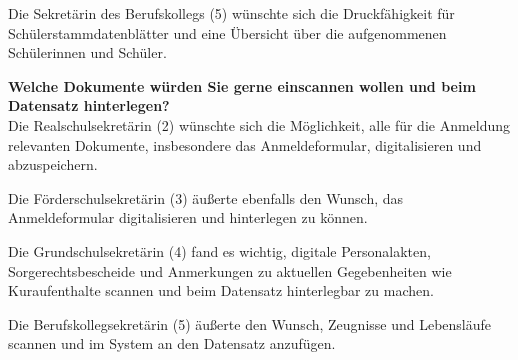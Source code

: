 Die Sekretärin des Berufskollegs (5) wünschte sich die Druckfähigkeit für Schülerstammdatenblätter und eine Übersicht über die aufgenommenen Schülerinnen und Schüler.

\textbf{Welche Dokumente würden Sie gerne einscannen wollen und beim Datensatz hinterlegen?}\\
Die Realschulsekretärin (2) wünschte sich die Möglichkeit, alle für die Anmeldung relevanten Dokumente, insbesondere das Anmeldeformular, digitalisieren und abzuspeichern.

Die Förderschulsekretärin (3) äußerte ebenfalls den Wunsch, das Anmeldeformular digitalisieren und hinterlegen zu können.

Die Grundschulsekretärin (4) fand es wichtig, digitale Personalakten, Sorgerechtsbescheide und Anmerkungen zu aktuellen Gegebenheiten wie Kuraufenthalte scannen und beim Datensatz hinterlegbar zu machen.

Die Berufskollegsekretärin (5) äußerte den Wunsch, Zeugnisse und Lebensläufe scannen und im System an den Datensatz anzufügen.
